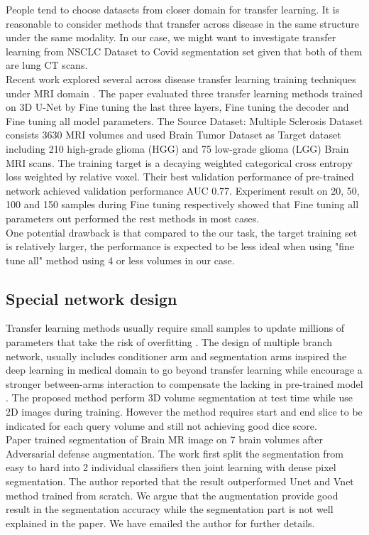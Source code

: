 People tend to choose datasets from closer domain for transfer learning. It is reasonable to consider methods that transfer across disease in the same structure under the same modality. In our case, we might want to investigate transfer learning from NSCLC Dataset to Covid segmentation set given that both of them are lung CT scans.\\

Recent work explored several across disease transfer learning training techniques under MRI domain \cite{wang_improving_2019}. The paper evaluated three transfer learning methods trained on 3D U-Net by Fine tuning the last three layers, Fine tuning the decoder and Fine tuning all model parameters. 
The Source Dataset: Multiple Sclerosis Dataset consists 3630 MRI volumes and used Brain Tumor Dataset as Target dataset including 210 high-grade glioma (HGG) and 75 low-grade glioma (LGG) Brain MRI scans. The training target is a decaying weighted categorical cross entropy loss weighted by relative voxel. Their best validation performance of pre-trained network achieved validation performance AUC 0.77. Experiment result on 20, 50, 100 and 150 samples during Fine tuning respectively showed that Fine tuning all parameters out performed the rest methods in most cases.\\

One potential drawback is that compared to the our task, the target training set is relatively larger, the performance is expected to be less ideal when using "fine tune all" method using 4 or less volumes in our case.

\subsection{Special network design}
Transfer learning methods usually require small samples to update millions of parameters that take the risk of overfitting \cite{shaban_one-shot_2017}. The design of multiple branch network, usually includes conditioner arm and segmentation arms inspired the deep learning in medical domain to go beyond transfer learning while encourage a stronger between-arms interaction to compensate the lacking in pre-trained model \cite{roy_squeeze_2019}. The proposed method perform 3D volume segmentation at test time while use 2D images during training. However the method requires start and end slice to be indicated for each query volume and still not achieving good dice score.\\

Paper \cite{suk_brain_2019} trained segmentation of Brain MR image on 7 brain volumes after Adversarial defense augmentation. The work first split the segmentation from easy to hard into 2 individual classifiers then joint learning with dense pixel segmentation. The author reported that the result outperformed Unet and Vnet method trained from scratch. We argue that the augmentation provide good result in the segmentation accuracy while the segmentation part is not well explained in the paper. We have emailed the author for further details.

